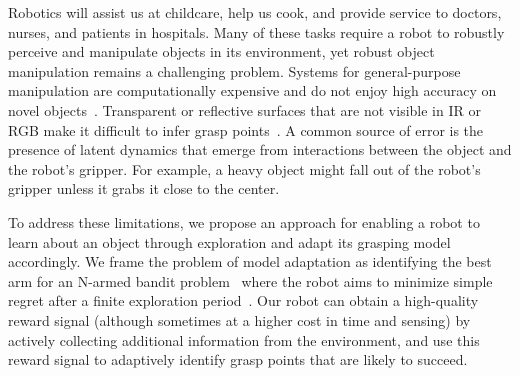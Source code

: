 \documentclass{article}
\begin{document}
Robotics will assist us at childcare, help us cook, and provide
service to doctors, nurses, and patients in hospitals. Many of these
tasks require a robot to robustly perceive and manipulate objects in
its environment, yet robust object manipulation remains a challenging
problem.  Systems for general-purpose manipulation are computationally
expensive and do not enjoy high accuracy on novel
objects~\citep{saxena08}.  Transparent or reflective surfaces that are
not visible in IR or RGB make it difficult to infer grasp
points~\citep{lysenkov13}.  A common source of error is the presence
of latent dynamics that emerge from interactions between the object
and the robot's gripper.  For example, a heavy object might fall out
of the robot's gripper unless it grabs it close to the center.


To address these limitations, we propose an approach for enabling a
robot to learn about an object through exploration and adapt its
grasping model accordingly.  We frame the problem of model adaptation
as identifying the best arm for an N-armed bandit
problem~\citep{thompson33} where the robot aims to minimize simple
regret after a finite exploration period~\citep{bubeck09}.  Our robot
can obtain a high-quality reward signal (although sometimes at a
higher cost in time and sensing) by actively collecting additional
information from the environment, and use this reward signal to
adaptively identify grasp points that are likely to succeed.  
\end{document}
